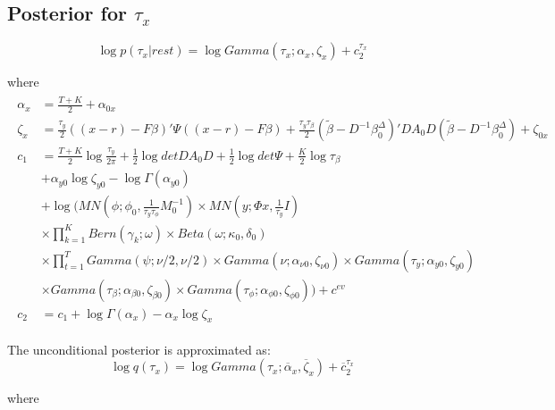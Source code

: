 \documentclass[11pt]{article}
\begin{document}
\subsection{Posterior for $\tau_x$}
\begin{equation}
	\log p\left(\tau_{x}|rest\right) = \log Gamma\left(\tau_{x};\alpha_{x},\zeta_{x}\right)+c_{2}^{\tau_{x}}
\end{equation}

where
\begin{align*}
\begin{split}
	\alpha_{x}	&=	\frac{T+K}{2}+\alpha_{0x}\\
	\zeta_{x}	&=	\frac{\tau_{y}}{2}\left(\left(x-r\right)-F\beta\right)'\Psi\left(\left(x-r\right)-F\beta\right)+\frac{\tau_{y}\tau_{\beta}}{2}\left(\tilde{\beta}-D^{-1}\beta_{0}^{\Delta}\right)'DA_{0}D\left(\tilde{\beta}-D^{-1}\beta_{0}^{\Delta}\right)+\zeta_{0x}\\
	c_{1}	&=	\frac{T+K}{2}\log\frac{\tau_{y}}{2\pi}+\frac{1}{2}\log detDA_{0}D+\frac{1}{2}\log det\Psi+\frac{K}{2}\log\tau_{\beta}\\
			&+\alpha_{y0}\log\zeta_{y0}-\log\Gamma\left(\alpha_{y0}\right)\\
			&+\log\Bigg(MN\left(\phi;\phi_{0},\frac{1}{\tau_{y}\tau_{\phi}}M_{0}^{-1}\right)\times MN\left(y;\Phi x,\frac{1}{\tau_{y}}I\right)\\
			&\times\prod_{k=1}^{K}Bern\left(\gamma_{k};\omega\right)\times Beta\left(\omega;\kappa_{0},\delta_{0}\right)\\
			&\times\prod_{t=1}^{T}Gamma\left(\psi;\nu/2,\nu/2\right)\times Gamma\left(\nu;\alpha_{\nu0},\zeta_{\nu0}\right)\times Gamma\left(\tau_{y};\alpha_{y0},\zeta_{y0}\right)\\
			&\times Gamma\left(\tau_{\beta};\alpha_{\beta0},\zeta_{\beta0}\right)\times Gamma\left(\tau_{\phi};\alpha_{\phi0},\zeta_{\phi0}\right)\Bigg)+c^{ev} \\
	c_{2}		&=	c_{1}+\log\Gamma\left(\alpha_{x}\right)-\alpha_{x}\log\zeta_{x}
\end{split}
\end{align*}

The unconditional posterior is approximated as:
\begin{equation}
	\log q\left(\tau_{x}\right) = \log Gamma\left(\tau_{x};\overline{\alpha}_{x},\overline{\zeta}_{x}\right)+\overline{c}_{2}^{\tau_{x}}
\end{equation}

where
\end{document}
